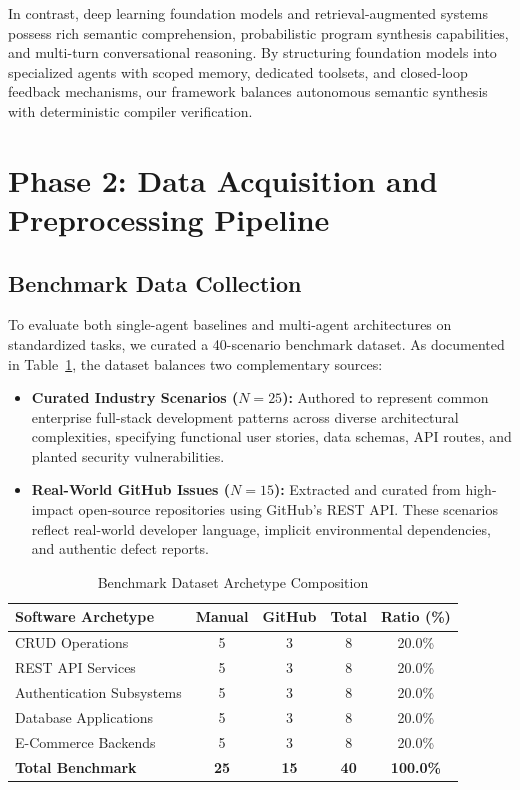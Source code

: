 \documentclass[10pt,journal,compsoc]{IEEEtran}
\begin{document}
In contrast, deep learning foundation models \cite{touvron2023llama} and retrieval-augmented systems \cite{lewis2020retrieval} possess rich semantic comprehension, probabilistic program synthesis capabilities, and multi-turn conversational reasoning. By structuring foundation models into specialized agents with scoped memory, dedicated toolsets, and closed-loop feedback mechanisms, our framework balances autonomous semantic synthesis with deterministic compiler verification.

\section{Phase 2: Data Acquisition and Preprocessing Pipeline}

\subsection{Benchmark Data Collection}
To evaluate both single-agent baselines and multi-agent architectures on standardized tasks, we curated a 40-scenario benchmark dataset. As documented in Table~\ref{tab:dataset_composition}, the dataset balances two complementary sources:
\begin{itemize}
    \item \textbf{Curated Industry Scenarios ($N=25$):} Authored to represent common enterprise full-stack development patterns across diverse architectural complexities, specifying functional user stories, data schemas, API routes, and planted security vulnerabilities.
    \item \textbf{Real-World GitHub Issues ($N=15$):} Extracted and curated from high-impact open-source repositories using GitHub's REST API. These scenarios reflect real-world developer language, implicit environmental dependencies, and authentic defect reports.
\end{itemize}

\begin{table}[h]
\centering
\caption{Benchmark Dataset Archetype Composition}
\label{tab:dataset_composition}
\begin{tabular}{lcccc}
\toprule
\textbf{Software Archetype} & \textbf{Manual} & \textbf{GitHub} & \textbf{Total} & \textbf{Ratio (\%)} \\
\midrule
CRUD Operations & 5 & 3 & 8 & 20.0\% \\
REST API Services & 5 & 3 & 8 & 20.0\% \\
Authentication Subsystems & 5 & 3 & 8 & 20.0\% \\
Database Applications & 5 & 3 & 8 & 20.0\% \\
E-Commerce Backends & 5 & 3 & 8 & 20.0\% \\
\midrule
\textbf{Total Benchmark} & \textbf{25} & \textbf{15} & \textbf{40} & \textbf{100.0\%} \\
\bottomrule
\end{tabular}
\end{table}
\end{document}
